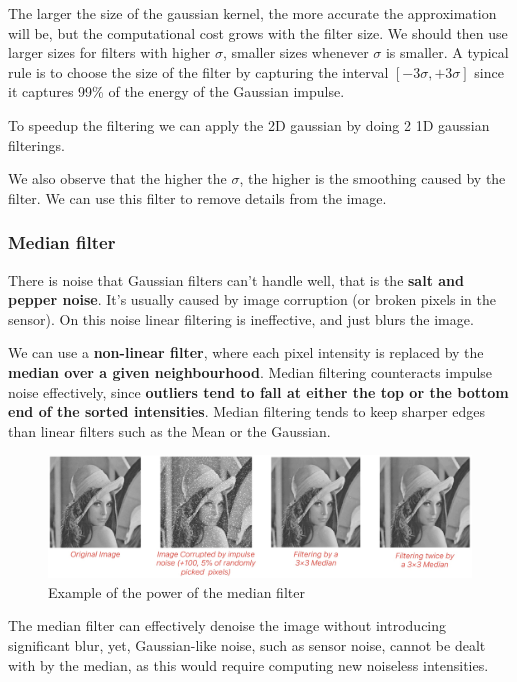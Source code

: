 The larger the size of the gaussian kernel, the more accurate the approximation will be, but the computational cost grows with the filter size.
We should then use larger sizes for filters with higher $\sigma$, smaller sizes whenever $\sigma$ is smaller.
A typical rule is to choose the size of the filter by capturing the interval $[-3\sigma, +3\sigma]$ since it captures 99\% of the energy of the Gaussian impulse.

To speedup the filtering we can apply the 2D gaussian by doing 2 1D gaussian filterings.

We also observe that the higher the $\sigma$, the higher is the smoothing caused by the filter.
We can use this filter to remove details from the image.

\subsubsection{Median filter}

There is noise that Gaussian filters can't handle well, that is the \textbf{salt and pepper noise}. It's usually caused by image corruption (or broken pixels in the sensor).
On this noise linear filtering is ineffective, and just blurs the image.

We can use a \textbf{non-linear filter}, where each pixel intensity is replaced by the \textbf{median over a given neighbourhood}.
Median filtering counteracts impulse noise effectively, since \textbf{outliers tend to fall at either the top or the bottom end of the sorted intensities}.
Median filtering tends to keep sharper edges than linear filters such as the Mean or the Gaussian.

\begin{figure}[htbp]
  \centering
  \includegraphics[width=0.9\linewidth]{./img/median_filter_application.jpg}
  \caption{Example of the power of the median filter}
  \label{fig:median_filter_application}
\end{figure}

The median filter can effectively denoise the image without introducing significant blur, yet, Gaussian-like noise, such as sensor noise, cannot be dealt with by the median, as this would require computing new noiseless intensities.

